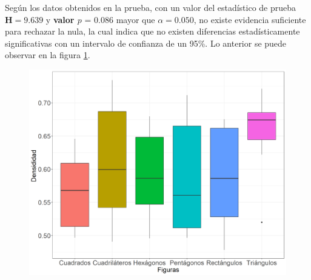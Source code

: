 \documentclass[5p,times]{elsarticle}
\begin{document}
Según los datos obtenidos en la prueba, con un valor del estadístico de prueba $\textbf{H} = 9.639$ y \textbf{valor $p$} = 0.086 mayor que $\alpha = 0.050$, no existe evidencia suficiente para rechazar la nula, la cual indica que no existen diferencias estadísticamente significativas con un intervalo de confianza de un 95\%. Lo anterior se puede observar en la figura \ref{fig:boxplotc1}. 		
	\begin{figure}
				\begin{center}
					\includegraphics[scale=0.35]{figuras/Ccboxplot.png}
					\label{fig:boxplotc1}
				\end{center}
			\end{figure}
			
\end{document}
